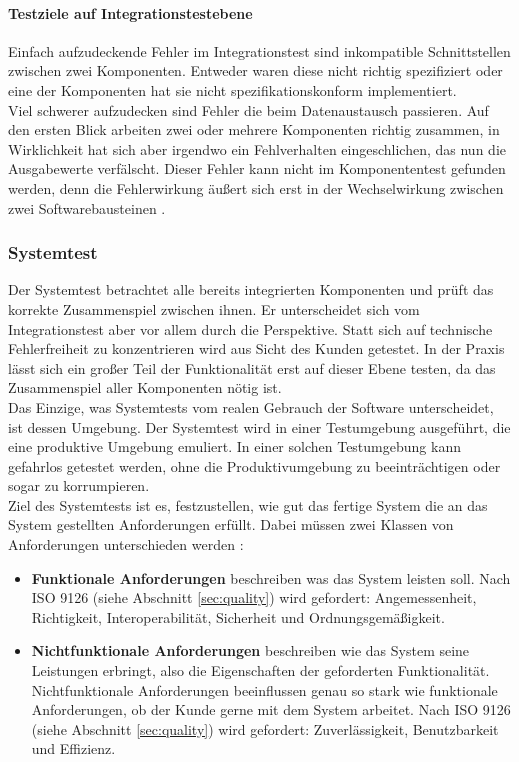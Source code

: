 \paragraph{Testziele auf Integrationstestebene}
Einfach aufzudeckende Fehler im Integrationstest sind inkompatible Schnittstellen zwischen zwei Komponenten. Entweder waren diese nicht richtig spezifiziert oder eine der Komponenten hat sie nicht spezifikationskonform implementiert.\\
Viel schwerer aufzudecken sind Fehler die beim Datenaustausch passieren. Auf den ersten Blick arbeiten zwei oder mehrere Komponenten richtig zusammen, in Wirklichkeit hat sich aber irgendwo ein Fehlverhalten eingeschlichen, das nun die Ausgabewerte verfälscht. Dieser Fehler kann nicht im Komponententest gefunden werden, denn die Fehlerwirkung äußert sich erst in der Wechselwirkung zwischen zwei Softwarebausteinen \cite{spillner_basiswissen_2012}.


\subsubsection{Systemtest}
Der Systemtest betrachtet alle bereits integrierten Komponenten und prüft das korrekte Zusammenspiel zwischen ihnen. Er unterscheidet sich vom Integrationstest aber vor allem durch die Perspektive. Statt sich auf technische Fehlerfreiheit zu konzentrieren wird aus Sicht des Kunden getestet. In der Praxis lässt sich ein großer Teil der Funktionalität erst auf dieser Ebene testen, da das Zusammenspiel aller Komponenten nötig ist.\\
Das Einzige, was Systemtests vom realen Gebrauch der Software unterscheidet, ist dessen Umgebung. Der Systemtest wird in einer Testumgebung ausgeführt, die eine produktive Umgebung emuliert. In einer solchen Testumgebung kann gefahrlos getestet werden, ohne die Produktivumgebung zu beeinträchtigen oder sogar zu korrumpieren.\\
Ziel des Systemtests ist es, festzustellen, wie gut das fertige System die an das System gestellten Anforderungen erfüllt. Dabei müssen zwei Klassen von Anforderungen unterschieden werden \cite{spillner_basiswissen_2012}:

\begin{itemize}
\item \textbf{Funktionale Anforderungen} beschreiben was das System leisten soll. Nach ISO 9126 (siehe Abschnitt \ref{sec:quality}) wird gefordert: Angemessenheit, Richtigkeit, Interoperabilität, Sicherheit und Ordnungsgemäßigkeit.
\item \textbf{Nichtfunktionale Anforderungen} beschreiben wie das System seine Leistungen erbringt, also die Eigenschaften der geforderten Funktionalität. Nichtfunktionale Anforderungen beeinflussen genau so stark wie funktionale Anforderungen, ob der Kunde gerne mit dem System arbeitet. Nach ISO 9126 (siehe Abschnitt \ref{sec:quality}) wird gefordert: Zuverlässigkeit, Benutzbarkeit und Effizienz.
\end{itemize}

